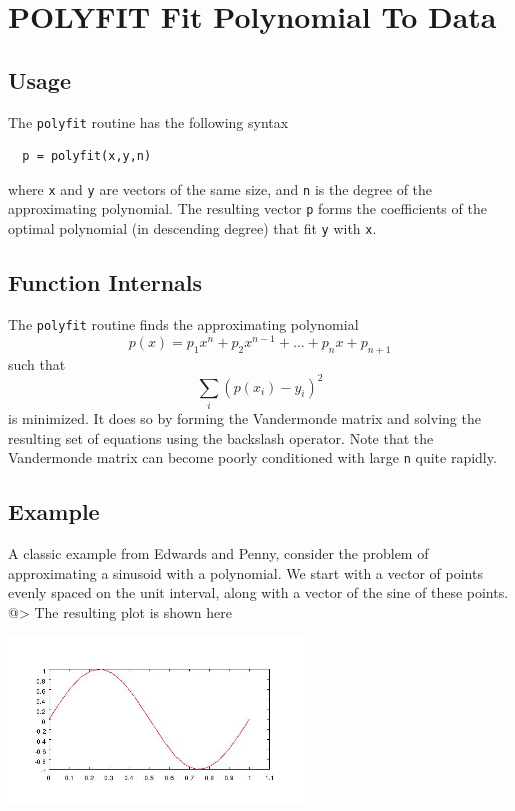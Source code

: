 \section{POLYFIT Fit Polynomial To Data}

\subsection{Usage}

The \verb|polyfit| routine has the following syntax
\begin{verbatim}
  p = polyfit(x,y,n)
\end{verbatim}
where \verb|x| and \verb|y| are vectors of the same size, and
\verb|n| is the degree of the approximating polynomial.  
The resulting vector \verb|p| forms the coefficients of
the optimal polynomial (in descending degree) that fit
\verb|y| with \verb|x|.  
\subsection{Function Internals}

The \verb|polyfit| routine finds the approximating polynomial
\[
   p(x) = p_1 x^n + p_2 x^{n-1} + \dots + p_n x + p_{n+1}
\]
such that
\[
   \sum_{i} (p(x_i) - y_i)^2
\]
is minimized.  It does so by forming the Vandermonde matrix
and solving the resulting set of equations using the backslash
operator.  Note that the Vandermonde matrix can become poorly
conditioned with large \verb|n| quite rapidly.
\subsection{Example}

A classic example from Edwards and Penny, consider the problem
of approximating a sinusoid with a polynomial.  We start with
a vector of points evenly spaced on the unit interval, along with
a vector of the sine of these points.
@>
The resulting plot is shown here


\centerline{\includegraphics[width=8cm]{polyfit1}}


